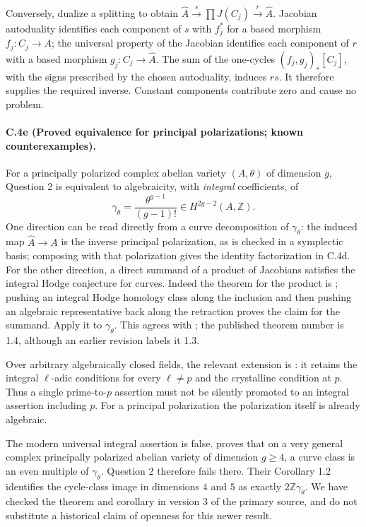 Conversely, dualize a splitting to obtain
$\widehat A\xrightarrow{s}\prod J(C_j)\xrightarrow{r}\widehat A$.
Jacobian autoduality identifies each component of $s$ with $f_j^*$
for a based morphism $f_j:C_j\to A$; the universal property of the
Jacobian identifies each component of $r$ with a based morphism
$g_j:C_j\to\widehat A$. The sum of the one-cycles
$(f_j,g_j)_*[C_j]$, with the signs prescribed by the chosen autoduality,
induces $rs$. It therefore supplies the required inverse. Constant
components contribute zero and cause no problem.

\paragraph{C.4e (Proved equivalence for principal polarizations; known counterexamples).}
For a principally polarized complex abelian variety $(A,\theta)$ of
dimension $g$, Question 2 is equivalent to algebraicity, with
\emph{integral} coefficients, of
\[
 \gamma_\theta=\frac{\theta^{g-1}}{(g-1)!}
 \in H^{2g-2}(A,\mathbb Z).
\]
One direction can be read directly from a curve decomposition of
$\gamma_\theta$: the induced map $\widehat A\to A$ is the inverse
principal polarization, as is checked in a symplectic basis; composing
with that polarization gives the identity factorization in C.4d.
For the other direction, a direct summand of a product of Jacobians
satisfies the integral Hodge conjecture for curves. Indeed the theorem
for the product is \citet[Theorem 1.2]{cyBeckmannFortman2023}; pushing
an integral Hodge homology class along the inclusion and then pushing
an algebraic representative back along the retraction proves the
claim for the summand. Apply it to $\gamma_\theta$.
This agrees with \citet[Theorem 1.4, Proposition 2.1,
Corollary 2.5]{cyVoisin2024}; the published theorem number is 1.4,
although an earlier revision labels it 1.3.

Over arbitrary algebraically closed fields, the relevant extension is
\citet[Theorem 1.2]{cyScaviaSuzuki2025}: it retains the integral
$\ell$-adic conditions for every $\ell\ne p$ and the crystalline
condition at $p$. Thus a single prime-to-$p$ assertion must not be
silently promoted to an integral assertion including $p$. For a
principal polarization the polarization itself is already algebraic.

The modern universal integral assertion is false.
\citet[Theorem 1.1]{cyEngelFortmanSchreieder2026} proves that on a very
general complex principally polarized abelian variety of dimension
$g\ge4$, a curve class is an even multiple of $\gamma_\theta$.
Question 2 therefore fails there. Their Corollary 1.2 identifies the
cycle-class image in dimensions $4$ and $5$ as exactly
$2\mathbb Z\gamma_\theta$. We have checked the theorem and corollary
in version 3 of the primary source, and do not substitute a historical
claim of openness for this newer result.

